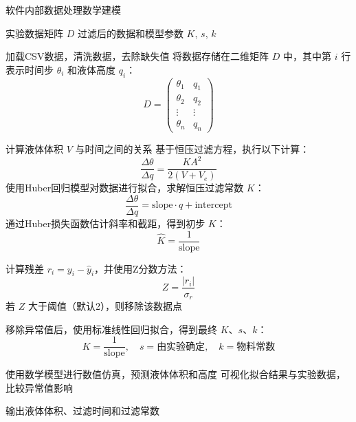 \begin{breakablealgorithm}
    \caption{软件内部数据处理数学建模}
    \begin{algorithmic}[1]
        \Require 实验数据矩阵 $D$
        \Ensure 过滤后的数据和模型参数 $K$, $s$, $k$
        
            \State 加载CSV数据，清洗数据，去除缺失值
            \State 将数据存储在二维矩阵 $D$ 中，其中第 $i$ 行表示时间步 $\theta_i$ 和液体高度 $q_i$：
            \[
            D = \begin{pmatrix}
            \theta_1 & q_1 \\
            \theta_2 & q_2 \\
            \vdots & \vdots \\
            \theta_n & q_n
            \end{pmatrix}
            \]
        \EndFunction
        
            \State 计算液体体积 $V$ 与时间之间的关系
            \State 基于恒压过滤方程，执行以下计算：
            \[
            \frac{\Delta \theta}{\Delta q} = \frac{K A^2}{2(V + V_e)}
            \]
            \State 使用Huber回归模型对数据进行拟合，求解恒压过滤常数 $K$：
            \[
            \frac{\Delta \theta}{\Delta q} = \text{slope} \cdot q + \text{intercept}
            \]
            \State 通过Huber损失函数估计斜率和截距，得到初步 $K$：
            \[
            \hat{K} = \frac{1}{\text{slope}}
            \]
        \EndFunction
        
            \State 计算残差 $r_i = y_i - \hat{y}_i$，并使用Z分数方法：
            \[
            Z = \frac{|r_i|}{\sigma_r}
            \]
            \State 若 $Z$ 大于阈值（默认2），则移除该数据点
        \EndFunction
        
            \State 移除异常值后，使用标准线性回归拟合，得到最终 $K$、$s$、$k$：
            \[
            K = \frac{1}{\text{slope}}, \quad s = \text{由实验确定}, \quad k = \text{物料常数}
            \]
        \EndFunction
        
            \State 使用数学模型进行数值仿真，预测液体体积和高度
            \State 可视化拟合结果与实验数据，比较异常值影响
        \EndFunction
        
            \State 输出液体体积、过滤时间和过滤常数
        \EndFunction
    \end{algorithmic}
\end{breakablealgorithm}

